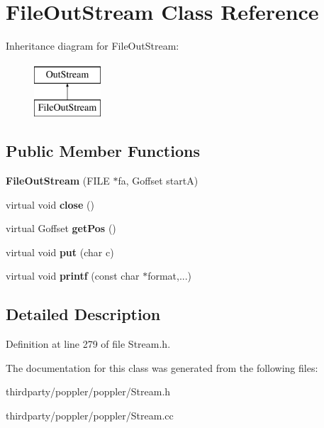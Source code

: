 \hypertarget{class_file_out_stream}{}\section{File\+Out\+Stream Class Reference}
\label{class_file_out_stream}
Inheritance diagram for File\+Out\+Stream\+:\begin{figure}[H]
\begin{center}
\leavevmode
\includegraphics[height=2.000000cm]{class_file_out_stream}
\end{center}
\end{figure}
\subsection*{Public Member Functions}
\begin{DoxyCompactItemize}
\item 
\mbox{\label{class_file_out_stream_a59b5790578824977a6c3562ec1cfdb3e}} 
{\bfseries File\+Out\+Stream} (F\+I\+LE $\ast$fa, Goffset startA)
\item 
\mbox{\label{class_file_out_stream_a6976801342476a4773c53d9a3b8bf72f}} 
virtual void {\bfseries close} ()
\item 
\mbox{\label{class_file_out_stream_a47d1a72ba3a742278a784301344bf66a}} 
virtual Goffset {\bfseries get\+Pos} ()
\item 
\mbox{\label{class_file_out_stream_adec9c6ac8dcdcb4ce946efd2a248b752}} 
virtual void {\bfseries put} (char c)
\item 
\mbox{\label{class_file_out_stream_adcb419075f0c51d3f87d985c6f502ab1}} 
virtual void {\bfseries printf} (const char $\ast$format,...)
\end{DoxyCompactItemize}


\subsection{Detailed Description}


Definition at line 279 of file Stream.\+h.



The documentation for this class was generated from the following files\+:\begin{DoxyCompactItemize}
\item 
thirdparty/poppler/poppler/Stream.\+h\item 
thirdparty/poppler/poppler/Stream.\+cc\end{DoxyCompactItemize}
